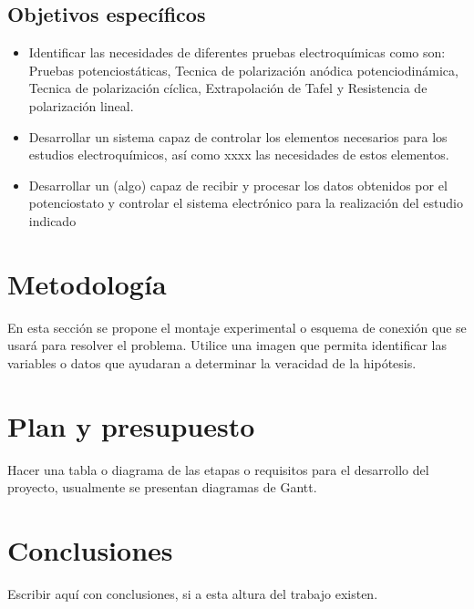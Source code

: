 \documentclass[twocolumns]{IEEEtran}
\begin{document}
\subsection{Objetivos específicos}
\begin{itemize}
\item  Identificar las necesidades de diferentes pruebas electroquímicas como son: Pruebas potenciostáticas, Tecnica de polarización anódica potenciodinámica, Tecnica de polarización cíclica, Extrapolación de Tafel y Resistencia de polarización lineal.  
\item Desarrollar un sistema capaz de controlar los elementos necesarios para los estudios electroquímicos, así como xxxx las necesidades de estos elementos.
\item Desarrollar un (algo) capaz de recibir y procesar los datos obtenidos por el potenciostato y controlar el sistema electrónico para la realización del estudio indicado
\end{itemize}
\section{Metodología}
En esta sección se propone el montaje experimental o esquema de conexión que se usará para resolver el problema. Utilice una imagen que permita identificar las variables o datos que ayudaran a determinar la veracidad de la hipótesis.  

\section{Plan y presupuesto}
Hacer una tabla o diagrama de las etapas o requisitos para el desarrollo del proyecto, usualmente se presentan diagramas de Gantt\cite{mycite2016}.

\section{Conclusiones}
Escribir aquí con conclusiones, si a esta altura del trabajo existen. 



\end{document}
